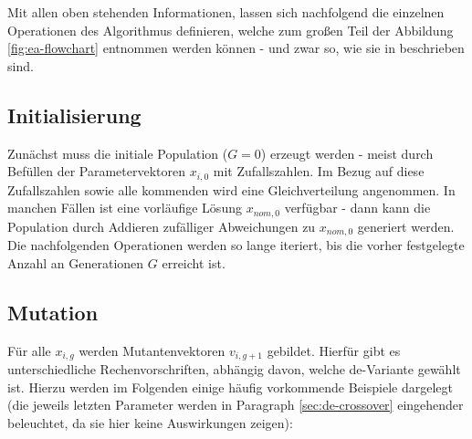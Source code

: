 		Mit allen oben stehenden Informationen, lassen sich nachfolgend die 
		einzelnen Operationen des Algorithmus definieren, welche zum großen 
		Teil der Abbildung \ref{fig:ea-flowchart} entnommen werden können - und 
		zwar so, wie sie in \cite{storn-price-de, storn-price-de-book} 
		beschrieben sind.
		
		\subsection{Initialisierung}
		\label{sec:de-init}
		
			Zunächst muss die initiale Population ($G = 0$) erzeugt werden - 
			meist durch Befüllen der Parametervektoren $x_{i, 0}$ mit 
			Zufallszahlen. Im Bezug auf diese Zufallszahlen sowie alle 
			kommenden wird eine Gleichverteilung angenommen. In manchen Fällen 
			ist eine vorläufige Lösung $x_{nom, 0}$ verfügbar - dann kann die 
			Population durch Addieren zufälliger Abweichungen zu $x_{nom, 0}$ 
			generiert werden. Die nachfolgenden Operationen werden so lange 
			iteriert, bis die vorher festgelegte Anzahl an Generationen $G$ 
			erreicht ist.
			
		\subsection{Mutation}
		\label{sec:de-mutation}
		
			Für alle $x_{i, g}$ werden Mutantenvektoren $v_{i, g+1}$ gebildet. 
			Hierfür gibt es unterschiedliche Rechenvorschriften, abhängig 
			davon, welche \gls{de}-Variante gewählt ist. Hierzu werden im 
			Folgenden einige häufig vorkommende Beispiele dargelegt (die 
			jeweils letzten Parameter werden in Paragraph 
			\ref{sec:de-crossover} eingehender beleuchtet, da sie hier keine 
			Auswirkungen zeigen):
			

